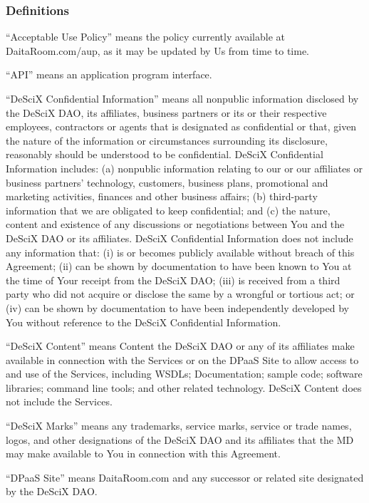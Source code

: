 \documentclass{article}
\begin{document}
\subsubsection*{Definitions} \label{sec:dpaas_definitions}

“Acceptable Use Policy” means the policy currently available at DaitaRoom.com/aup, as it may be updated by Us from time to time.

“API” means an application program interface.

“DeSciX Confidential Information” means all nonpublic information disclosed by the DeSciX DAO, its affiliates, business partners or its or their respective employees, contractors or agents that is designated as confidential or that, given the nature of the information or circumstances surrounding its disclosure, reasonably should be understood to be confidential. DeSciX Confidential Information includes: (a) nonpublic information relating to our or our affiliates or business partners’ technology, customers, business plans, promotional and marketing activities, finances and other business affairs; (b) third-party information that we are obligated to keep confidential; and (c) the nature, content and existence of any discussions or negotiations between You and the DeSciX DAO or its affiliates. DeSciX Confidential Information does not include any information that: (i) is or becomes publicly available without breach of this Agreement; (ii) can be shown by documentation to have been known to You at the time of Your receipt from the DeSciX DAO; (iii) is received from a third party who did not acquire or disclose the same by a wrongful or tortious act; or (iv) can be shown by documentation to have been independently developed by You without reference to the DeSciX Confidential Information.

“DeSciX Content” means Content the DeSciX DAO or any of its affiliates make available in connection with the Services or on the DPaaS Site to allow access to and use of the Services, including WSDLs; Documentation; sample code; software libraries; command line tools; and other related technology. DeSciX Content does not include the Services.

“DeSciX Marks” means any trademarks, service marks, service or trade names, logos, and other designations of the DeSciX DAO and its affiliates that the MD may make available to You in connection with this Agreement.

“DPaaS Site” means DaitaRoom.com and any successor or related site designated by the DeSciX DAO.
\end{document}
